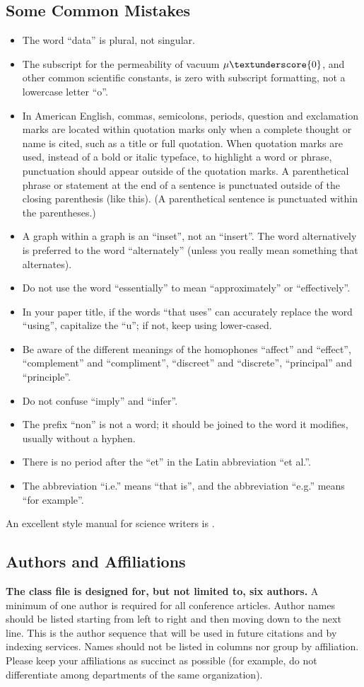 \documentclass[conference]{IEEEtran}
\begin{document}
\subsection{Some Common Mistakes}\label{SCM}
\begin{itemize}
\item The word ``data'' is plural, not singular.
\item The subscript for the permeability of vacuum $\mu\textunderscore {0}$, and other common scientific constants, is zero with subscript formatting, not a lowercase letter ``o''.
\item In American English, commas, semicolons, periods, question and exclamation marks are located within quotation marks only when a complete thought or name is cited, such as a title or full quotation. When quotation marks are used, instead of a bold or italic typeface, to highlight a word or phrase, punctuation should appear outside of the quotation marks. A parenthetical phrase or statement at the end of a sentence is punctuated outside of the closing parenthesis (like this). (A parenthetical sentence is punctuated within the parentheses.)
\item A graph within a graph is an ``inset'', not an ``insert''. The word alternatively is preferred to the word ``alternately'' (unless you really mean something that alternates).
\item Do not use the word ``essentially'' to mean ``approximately'' or ``effectively''.
\item In your paper title, if the words ``that uses'' can accurately replace the word ``using'', capitalize the ``u''; if not, keep using lower-cased.
\item Be aware of the different meanings of the homophones ``affect'' and ``effect'', ``complement'' and ``compliment'', ``discreet'' and ``discrete'', ``principal'' and ``principle''.
\item Do not confuse ``imply'' and ``infer''.
\item The prefix ``non'' is not a word; it should be joined to the word it modifies, usually without a hyphen.
\item There is no period after the ``et'' in the Latin abbreviation ``et al.''.
\item The abbreviation ``i.e.'' means ``that is'', and the abbreviation ``e.g.'' means ``for example''.
\end{itemize}
An excellent style manual for science writers is \cite{b7}.

\subsection{Authors and Affiliations}
\textbf{The class file is designed for, but not limited to, six authors.} A 
minimum of one author is required for all conference articles. Author names 
should be listed starting from left to right and then moving down to the 
next line. This is the author sequence that will be used in future citations 
and by indexing services. Names should not be listed in columns nor group by 
affiliation. Please keep your affiliations as succinct as possible (for 
example, do not differentiate among departments of the same organization).
\end{document}
